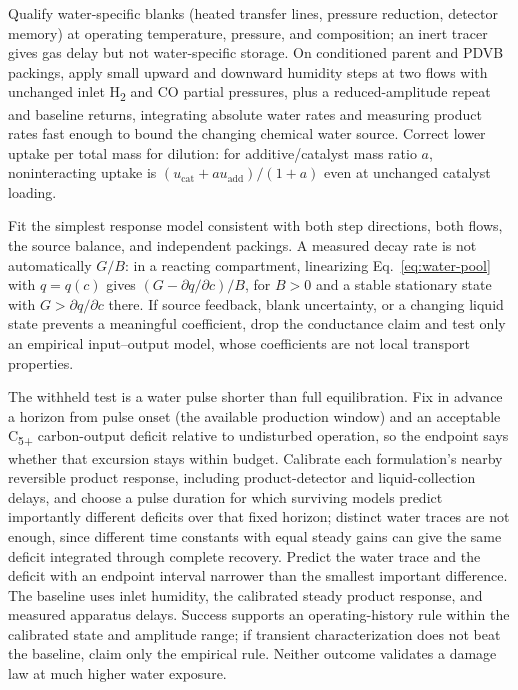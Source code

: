 Qualify water-specific blanks (heated transfer lines, pressure reduction, detector memory) at operating temperature, pressure, and composition; an inert tracer gives gas delay but not water-specific storage. On conditioned parent and PDVB packings, apply small upward and downward humidity steps at two flows with unchanged inlet H\textsubscript{2} and CO partial pressures, plus a reduced-amplitude repeat and baseline returns, integrating absolute water rates and measuring product rates fast enough to bound the changing chemical water source. Correct lower uptake per total mass for dilution: for additive/catalyst mass ratio $a$, noninteracting uptake is $(u_{\mathrm{cat}}+a u_{\mathrm{add}})/(1+a)$ even at unchanged catalyst loading.

Fit the simplest response model consistent with both step directions, both flows, the source balance, and independent packings. A measured decay rate is not automatically $G/B$: in a reacting compartment, linearizing Eq.~\ref{eq:water-pool} with $q=q(c)$ gives $(G-\partial q/\partial c)/B$, for $B>0$ and a stable stationary state with $G>\partial q/\partial c$ there. If source feedback, blank uncertainty, or a changing liquid state prevents a meaningful coefficient, drop the conductance claim and test only an empirical input--output model, whose coefficients are not local transport properties.

The withheld test is a water pulse shorter than full equilibration. Fix in advance a horizon from pulse onset (the available production window) and an acceptable C\textsubscript{5+} carbon-output deficit relative to undisturbed operation, so the endpoint says whether that excursion stays within budget. Calibrate each formulation's nearby reversible product response, including product-detector and liquid-collection delays, and choose a pulse duration for which surviving models predict importantly different deficits over that fixed horizon; distinct water traces are not enough, since different time constants with equal steady gains can give the same deficit integrated through complete recovery. Predict the water trace and the deficit with an endpoint interval narrower than the smallest important difference. The baseline uses inlet humidity, the calibrated steady product response, and measured apparatus delays. Success supports an operating-history rule within the calibrated state and amplitude range; if transient characterization does not beat the baseline, claim only the empirical rule. Neither outcome validates a damage law at much higher water exposure.

